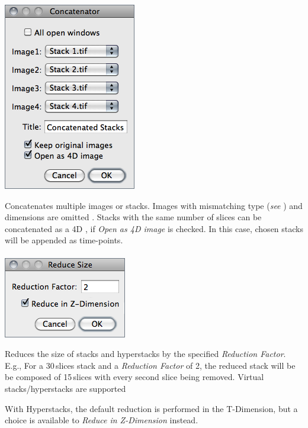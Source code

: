 \begin{minipage}[c][1\totalheight][t]{0.328\columnwidth}%
\includegraphics[scale=0.55]{images/Concatenate}%
\end{minipage}%
\begin{minipage}[c][1\totalheight][t]{0.672\columnwidth}%
Concatenates multiple images or stacks. Images
with mismatching type (\emph{see} ) and
dimensions are omitted \cite{C-Concatenator}. Stacks with the same
number of slices can be concatenated as a 4D ,
if \emph{Open as 4D image} is checked. In this case, chosen stacks
will be appended as time-points.


%
\end{minipage}


\paragraph{\protect{}\label{sub:Reduce...}}

\begin{minipage}[c][1\totalheight][t]{0.302\columnwidth}%
\includegraphics[scale=0.55]{images/ReduceSize}%
\end{minipage}%
\begin{minipage}[c][1\totalheight][t]{0.698\columnwidth}%
Reduces the size of stacks and hyperstacks by the specified \emph{Reduction
Factor}. E.g., For a 30\,slices stack and a \emph{Reduction Factor}
of 2, the reduced stack will be be composed of 15\,slices with every
second slice being removed. Virtual stacks/hyperstacks are supported
\medskip{}


With Hyperstacks, the default reduction is performed in the T-Dimension,
but a choice is available to \emph{Reduce in Z-Dimension} instead.%
\end{minipage}



